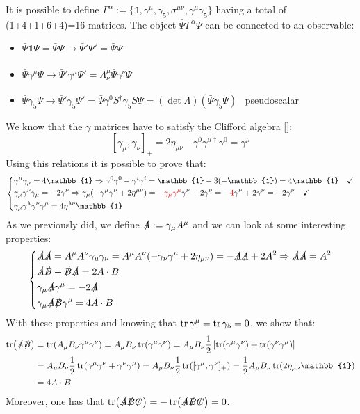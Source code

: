 \documentclass[../main.tex]{subfiles}
\begin{document}
It is possible to define $\Gamma^\alpha:=\{\mathbb{1},\gamma^\mu,\gamma_5,\sigma^{\mu\nu},\gamma^\mu\gamma_5\}$ having a total of (1+4+1+6+4)=16 matrices. The object $\bar{\Psi}\Gamma^\alpha\Psi$ can be connected to an observable:
\begin{itemize}
    \item $\bar{\Psi}\mathbb{1}\Psi=\bar{\Psi}\Psi\xrightarrow[]{}\bar{\Psi}'\Psi'=\bar{\Psi}\Psi$
    \item $\bar{\Psi}\gamma^\mu\Psi\xrightarrow[]{}\bar{\Psi}'\gamma^\mu\Psi'=\Lambda^\mu_\nu\bar{\Psi}\gamma^\nu\Psi$
    \item $\bar{\Psi}\gamma_5\Psi\xrightarrow[]{}\bar{\Psi}'\gamma_5\Psi'=\bar{\Psi}\gamma^0S^\dagger\gamma_5S\Psi=(\det\Lambda)(\bar{\Psi}\gamma_5\Psi)$ \,  pseudoscalar
\end{itemize}
We know that the $\gamma$ matrices have to satisfy the Clifford algebra []:
\[
[\gamma_\mu,\gamma_\nu]_+=2\eta_{\mu\nu} \quad \gamma^0\gamma^{\mu\dagger}\gamma^0=\gamma^\mu
\]
Using this relations it is possible to prove that:
\[
\left\{
\begin{aligned}
&\gamma^\mu\gamma_\mu=4\mathbb{1}\Rightarrow\gamma^0\gamma^0-\gamma^i\gamma^i=\mathbb{1}-3(-\mathbb{1})=4\mathbb{1} \quad \checkmark\\
&\gamma_\mu\gamma^\nu\gamma_\mu=-2\gamma^\nu\Rightarrow\gamma_\mu(-\gamma^\mu\gamma^\nu+2\eta^{\mu\nu})=-{\color{red}\gamma_\mu\gamma^\mu}\gamma^\nu+2\gamma^\nu=-{\color{red}4}\gamma^\nu+2\gamma^\nu=-2\gamma^\nu \quad \checkmark\\
&\gamma_\mu\gamma^\lambda\gamma^\nu\gamma^\mu=4\eta^{\lambda\nu}\mathbb{1}
\end{aligned}
\right.
\]
As we previously did, we define $\slashed{A}:=\gamma_\mu A^\mu$ and we can look at some interesting properties:
\[
\left\{
\begin{aligned}
&\slashed{A}\slashed{A}=A^\mu A^\nu\gamma_\mu\gamma_\nu=A^\mu A^\nu(-\gamma_\nu\gamma^\mu+2\eta_{\mu\nu})=-\slashed{A}\slashed{A}+2A^2\Rightarrow\slashed{A}\slashed{A}=A^2\\
&\slashed{A}\slashed{B}+\slashed{B}\slashed{A}=2A\cdot B\\
&\gamma_\mu\slashed{A}\gamma^\mu=-2\slashed{A}\\
&\gamma_\mu\slashed{A}\slashed{B}\gamma^\mu=4A\cdot B
\end{aligned}
\right.
\]
With these properties and knowing that $\tr\gamma^\mu=\tr\gamma_5=0$, we show that:
\begin{align*}
\tr(\slashed{A}\slashed{B})&=\tr(A_\mu B_\nu\gamma^\mu\gamma^\nu)=A_\mu B_\nu\tr(\gamma^\mu\gamma^\nu)=A_\mu B_\nu\frac{1}{2}\left[\tr(\gamma^\mu\gamma^\nu)+\tr(\gamma^\nu\gamma^\mu)\right]\\
&=A_\mu B_\nu\frac{1}{2}\tr(\gamma^\mu\gamma^\nu+\gamma^\nu\gamma^\mu)=A_\mu B_\nu\frac{1}{2}\tr([\gamma^\mu,\gamma^\nu]_+)=\frac{1}{2}A_\mu B_\nu\tr(2\eta_{\mu\nu}\mathbb{1})\\
&=4A\cdot B
\end{align*}
Moreover, one has that $\tr(\slashed{A}\slashed{B}\slashed{C})=-\tr(\slashed{A}\slashed{B}\slashed{C})=0$.
\end{document}
